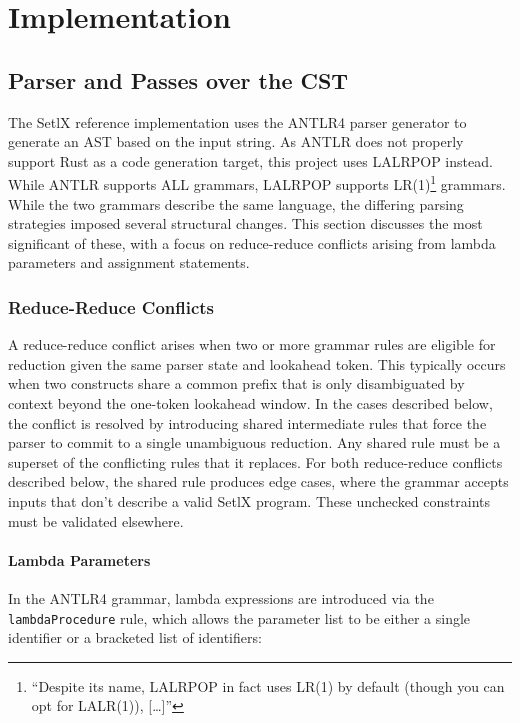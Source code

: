 \chapter{Implementation}

\section{Parser and Passes over the \acf{CST}}

The SetlX reference implementation uses the ANTLR4 parser generator to generate an \ac{AST} based on the input string. As ANTLR does not properly support Rust as a code generation target, this project uses LALRPOP instead. While ANTLR supports \acf{ALL} grammars, LALRPOP supports LR(1)\footnote{\enquote{Despite its name, LALRPOP in fact uses LR(1) by default (though you can opt for LALR(1)), [\dots]}\cite{lalrpop-crates-io}} grammars. While the two grammars describe the same language, the differing parsing strategies imposed several structural changes. This section discusses the most significant of these, with a focus on reduce-reduce conflicts arising from lambda parameters and assignment statements.

\subsection{Reduce-Reduce Conflicts}

A reduce-reduce conflict arises when two or more grammar rules are eligible for reduction given the same parser state and lookahead token. This typically occurs when two constructs share a common prefix that is only disambiguated by context beyond the one-token lookahead window. In the cases described below, the conflict is resolved by introducing shared intermediate rules that force the parser to commit to a single unambiguous reduction. Any shared rule must be a superset of the conflicting rules that it replaces. For both reduce-reduce conflicts described below, the shared rule produces edge cases, where the grammar accepts inputs that don't describe a valid SetlX program. These unchecked constraints must be validated elsewhere.

\subsubsection{Lambda Parameters}

In the ANTLR4 grammar, lambda expressions are introduced via the \texttt{lambdaProcedure} rule, which allows the parameter list to be either a single identifier or a bracketed list of identifiers:

